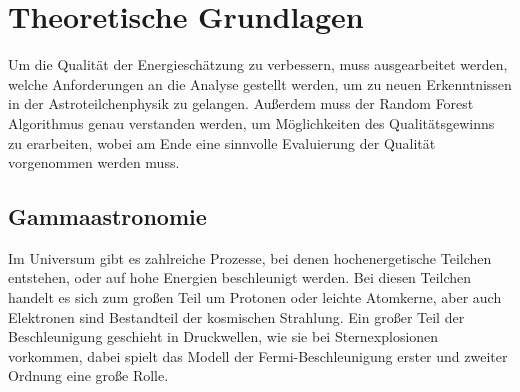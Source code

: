 \chapter{Theoretische Grundlagen}

Um die Qualität der Energieschätzung zu verbessern, muss ausgearbeitet werden, welche Anforderungen an die Analyse gestellt
werden, um zu neuen Erkenntnissen in der Astroteilchenphysik zu gelangen.
Außerdem muss der Random Forest Algorithmus genau verstanden werden, um Möglichkeiten des Qualitätsgewinns zu erarbeiten,
wobei am Ende eine sinnvolle Evaluierung der Qualität vorgenommen werden muss.

\section{Gammaastronomie}
\label{sec:Gammaastronomie}

Im Universum gibt es zahlreiche Prozesse, bei denen hochenergetische Teilchen entstehen, oder auf hohe Energien beschleunigt werden.
Bei diesen Teilchen handelt es sich zum großen Teil um Protonen oder leichte Atomkerne, aber auch Elektronen
sind Bestandteil der kosmischen Strahlung.
Ein großer Teil der Beschleunigung geschieht in Druckwellen, wie sie bei Sternexplosionen vorkommen, dabei spielt das Modell der
Fermi-Beschleunigung erster und zweiter Ordnung eine große Rolle.
%

